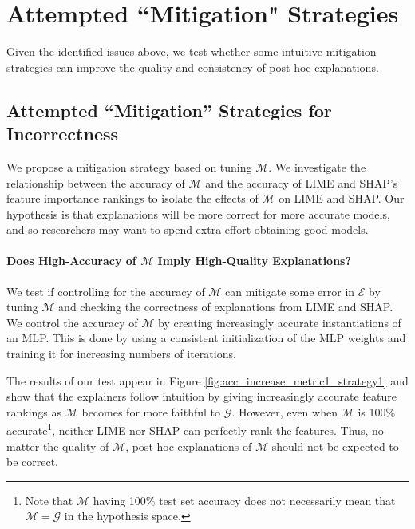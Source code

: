 \documentclass[11pt]{article}    %
\begin{document}
        

    \section{Attempted ``Mitigation" Strategies}
    Given the identified issues above, we test whether some intuitive mitigation strategies can improve the quality and consistency of post hoc explanations.  
        \subsection{Attempted ``Mitigation'' Strategies for Incorrectness}
        \label{sec:mitigation} %
            We propose a mitigation strategy based on tuning $\mathcal{M}$. We investigate the relationship between the accuracy of $\mathcal{M}$ and the accuracy of LIME and SHAP's feature importance rankings to isolate the effects of $\mathcal{M}$ on LIME and SHAP.  Our hypothesis is that explanations will be more correct for more accurate models, and so researchers may want to spend extra effort obtaining good models. %


            \paragraph{Does High-Accuracy of $\mathcal{M}$ Imply High-Quality Explanations?}
            \label{sec:m_fidelity}
                 We test if controlling for the accuracy of $\mathcal{M}$ can mitigate some error in $\mathcal{E}$ by tuning $\mathcal{M}$ and checking the correctness of explanations from LIME and SHAP. We control the accuracy of $\mathcal{M}$ by creating increasingly accurate instantiations of an MLP. This is done by using a consistent initialization of the MLP weights and training it for increasing numbers of iterations.
                
                The results of our test appear in Figure \ref{fig:acc_increase_metric1_strategy1} and show that the explainers follow intuition by giving increasingly accurate feature rankings as $\mathcal{M}$ becomes for more faithful to $\mathcal{G}$. However, even when $\mathcal{M}$ is 100\% accurate\footnote{Note that $\mathcal{M}$ having 100\% test set accuracy does not necessarily mean that $\mathcal{M}=\mathcal{G}$ in the hypothesis space.}, neither LIME nor SHAP can perfectly rank the features. Thus, no matter the quality of $\mathcal{M}$,  post hoc explanations of $\mathcal{M}$ should not be expected to be correct.
            
\end{document}

